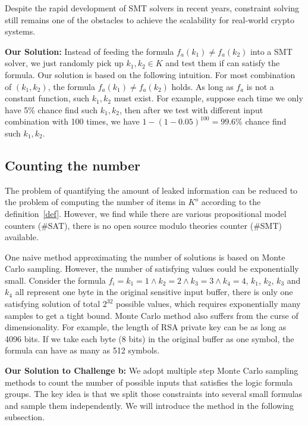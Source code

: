 Despite the rapid development of SMT solvers in recent years, constraint solving still
remains one of the obstacles to achieve the scalability for real-world crypto systems.

\vspace*{2pt}
\textbf{Our Solution:}
Instead of feeding the formula $f_a(k_1) \neq f_a(k_2)$ into a SMT solver, we just
randomly pick up $k_1, k_2 \in K$ and test them if can satisfy the formula. Our
solution is based on the following intuition. For most combination of 
$(k_{1}, k_{2} )$, the formula $f_a(k_1) \neq f_a(k_2)$ holds. As long as 
$f_a$ is not a constant function, such $k_1, k_2$ must exist. For example,
suppose each time we only have 5\% chance find such $k_1, k_2$, then
after we test with different input combination with 100 times, we have 
$1 - (1-0.05)^{100} = 99.6\%$ chance find such $k_1, k_2$.

\subsection{Counting the number}
\label{MCreasons}
The problem of quantifying the amount of leaked information can be reduced to 
the problem of computing the number of items in $K^o$ according to the definition~\ref{def}.
However, we find while there are various propositional model counters (\#SAT), there is no
open source modulo theories counter (\#SMT) available.

One naive method approximating the number of solutions is based on Monte Carlo sampling.
However, the number of satisfying values could be exponentially small. Consider the formula
$f_i={k_1} = 1\land{k_2} = 2\land{k_3} = 3\land{k_4} = 4$, $k_1$, $k_2$, $k_3$ and $k_4$ 
all represent one byte in the original sensitive input buffer, 
there is only one satisfying solution of total $2^{32}$ possible
values, which requires exponentially many samples to get a tight bound. 
Monte Carlo method also suffers from the curse of dimensionality. For example, 
the length of RSA private key can be as long as 4096 bits.
If we take each byte (8 bits) in the original buffer as one symbol, the formula can have 
as many as 512 symbols. 

\vspace*{6pt}
\textbf{Our Solution to Challenge b:}
We adopt multiple step Monte Carlo sampling methods to count the number of possible inputs
that satisfies the logic formula groups. The key idea is that 
we split those constraints into several small formulas and sample them independently.  
We will introduce the method in the following subsection.

